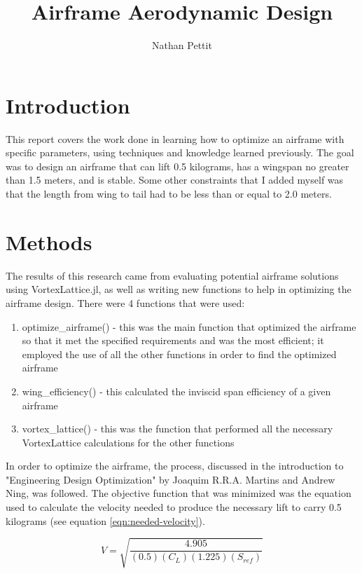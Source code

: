 \documentclass{journal}
\title{Airframe Aerodynamic Design}
\author{Nathan Pettit}
\begin{document}
	
	\maketitle	
	
	\section{Introduction}
	
	This report covers the work done in learning how to optimize an airframe with specific parameters, using techniques and knowledge learned previously. The goal was to design an airframe that can lift 0.5 kilograms, has a wingspan no greater than 1.5 meters, and is stable. Some other constraints that I added myself was that the length from wing to tail had to be less than or equal to 2.0 meters.
	
	\section{Methods}
	The results of this research came from evaluating potential airframe solutions using VortexLattice.jl, as well as writing new functions to help in optimizing the airframe design. There were 4 functions that were  used:
	
	\begin{enumerate}
		\item optimize\_airframe() - this was the main function that optimized the airframe so that it met the specified requirements and was the most efficient; it employed the use of all the other functions in order to find the optimized airframe
		\item wing\_efficiency() - this calculated the inviscid span efficiency of a given airframe
		\item vortex\_lattice() - this was the function that performed all the necessary VortexLattice calculations for the other functions 
	\end{enumerate}

	In order to optimize the airframe, the process, discussed in the introduction to "Engineering Design Optimization" by Joaquim R.R.A. Martins and Andrew Ning, was followed. The objective function  that was minimized was the equation used to calculate the velocity needed to produce the necessary lift to carry 0.5 kilograms (see equation \ref{eqn:needed-velocity}).
	
	\begin{equation}
		V = \sqrt{\frac{4.905}{(0.5)(C_L)(1.225)(S_{ref})}}
		\label{eqn:needed-velocity}
	\end{equation}
	
\end{document}
